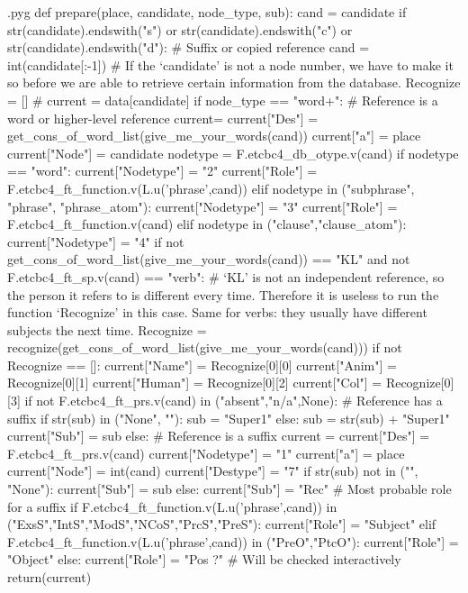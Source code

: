 \documentclass{report}
\makeatletter
\newenvironment{python}{%
  \VerbatimEnvironment
  \minted@resetoptions
  \setkeys{minted@opt}{}
      \begin{VerbatimOut}{\jobname.pyg}}
{%
      \end{VerbatimOut}
      \minted@pygmentize{python}
      \DeleteFile{\jobname.pyg}}
\makeatother
\begin{document}
\begin{python}
def prepare(place, candidate, node_type, sub):
    cand = candidate
    if str(candidate).endswith("s") or str(candidate).endswith("c") or str(candidate).endswith("d"): # Suffix or copied reference
        cand = int(candidate[:-1]) # If the `candidate' is not a node number, we have to make it so before we are able to retrieve certain information from the database.
    Recognize = []
#    current = data[candidate]
    if node_type == "word+": # Reference is a word or higher-level reference
        current= {}
        current["Des"] = get_cons_of_word_list(give_me_your_words(cand))
        current["a"] = place
        current["Node"] = candidate
        nodetype = F.etcbc4_db_otype.v(cand)
        if nodetype == "word":
            current["Nodetype"] = "2"
            current["Role"] = F.etcbc4_ft_function.v(L.u('phrase',cand))
        elif nodetype in ("subphrase", "phrase", "phrase_atom"):
            current["Nodetype"] = "3"
            current["Role"] = F.etcbc4_ft_function.v(cand)
        elif nodetype in ("clause","clause_atom"):
            current["Nodetype"] = "4"
        if not get_cons_of_word_list(give_me_your_words(cand)) == "KL" and not F.etcbc4_ft_sp.v(cand) == "verb": # `KL' is not an independent reference, so the person it refers to is different every time. Therefore it is useless to run the function `Recognize' in this case. Same for verbs: they usually have different subjects the next time.
            Recognize = recognize(get_cons_of_word_list(give_me_your_words(cand)))
        if not Recognize == []:
            current["Name"] = Recognize[0][0]
            current["Anim"] = Recognize[0][1]
            current["Human"] = Recognize[0][2]
            current["Col"] = Recognize[0][3]
        if not F.etcbc4_ft_prs.v(cand) in ("absent","n/a",None): # Reference has a suffix
            if str(sub) in ("None", ""):
                sub = "Super1"
            else:
                sub = str(sub) + "Super1"
        current["Sub"] = sub
    else: # Reference is a suffix
        current = {}
        current["Des"] = F.etcbc4_ft_prs.v(cand)
        current["Nodetype"] = "1"
        current["a"] = place
        current["Node"] = int(cand)
        current["Destype"] = "7"
        if str(sub) not in ("", "None"):
            current["Sub"] = sub
        else:
            current["Sub"] = "Rec" # Most probable role for a suffix
        if F.etcbc4_ft_function.v(L.u('phrase',cand)) in ("ExsS","IntS","ModS","NCoS","PrcS","PreS"):
            current["Role"] = "Subject"
        elif F.etcbc4_ft_function.v(L.u('phrase',cand)) in ("PreO","PtcO"):
            current["Role"] = "Object"
        else:
            current["Role"] = "Pos ?" # Will be checked interactively
    return(current)

\end{python}
\end{document}
